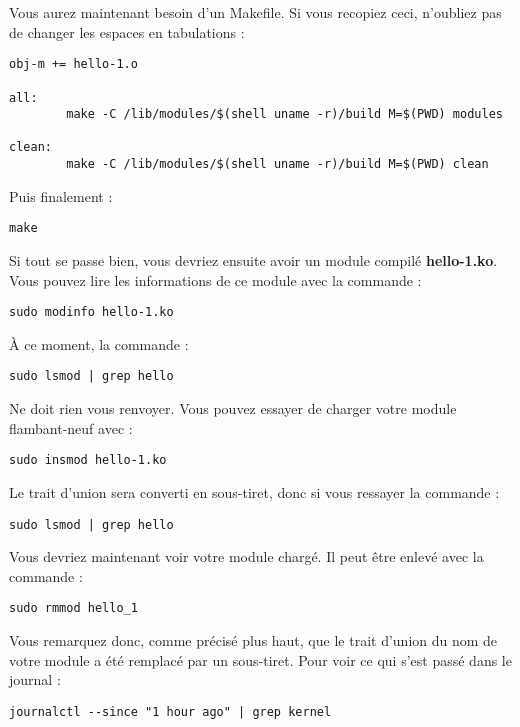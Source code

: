 \documentclass[11pt]{article}
\begin{document}
Vous aurez maintenant besoin d'un Makefile. Si vous recopiez ceci, n'oubliez pas de changer les espaces en tabulations :

\begin{verbatim}
obj-m += hello-1.o

all:
        make -C /lib/modules/$(shell uname -r)/build M=$(PWD) modules

clean:
        make -C /lib/modules/$(shell uname -r)/build M=$(PWD) clean
\end{verbatim}

Puis finalement :

\begin{verbatim}
make
\end{verbatim}

Si tout se passe bien, vous devriez ensuite avoir un module compilé \textbf{hello-1.ko}. Vous pouvez lire les informations de ce module avec la commande :

\begin{verbatim}
sudo modinfo hello-1.ko
\end{verbatim}

À ce moment, la commande :

\begin{verbatim}
sudo lsmod | grep hello
\end{verbatim}

Ne doit rien vous renvoyer. Vous pouvez essayer de charger votre module flambant-neuf avec :

\begin{verbatim}
sudo insmod hello-1.ko
\end{verbatim}

Le trait d'union sera converti en sous-tiret, donc si vous ressayer la commande :

\begin{verbatim}
sudo lsmod | grep hello
\end{verbatim}

Vous devriez maintenant voir votre module chargé. Il peut être enlevé avec la commande :

\begin{verbatim}
sudo rmmod hello_1
\end{verbatim}

Vous remarquez donc, comme précisé plus haut, que le trait d'union du nom de votre module a été remplacé par un sous-tiret. Pour voir ce qui s'est passé dans le journal :

\begin{verbatim}
journalctl --since "1 hour ago" | grep kernel
\end{verbatim}
\end{document}
